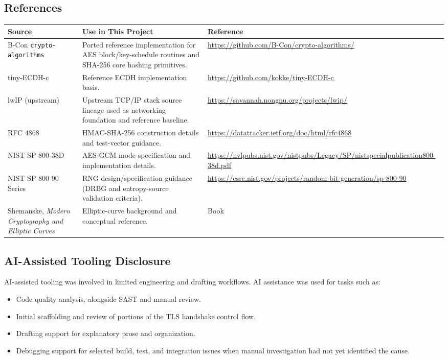 \documentclass[titlepage]{report}
\renewcommand{\arraystretch}{1.5}
\begin{document}
	\subsection{References}
	\begin{table}[htbp]
		\centering
		\renewcommand{\arraystretch}{1.12}
		{\footnotesize
		\begin{tabularx}{\textwidth}{p{} p{} p{}}
			\hline
			\textbf{Source} & \textbf{Use in This Project} & \textbf{Reference} \\
			\hline
			B-Con \texttt{crypto-algorithms} & Ported reference implementation for AES block/key-schedule routines and SHA-256 core hashing primitives. & \url{https://github.com/B-Con/crypto-algorithms/} \\
			tiny-ECDH-c & Reference ECDH implementation basis. & \url{https://github.com/kokke/tiny-ECDH-c} \\
			lwIP (upstream) & Upstream TCP/IP stack source lineage used as networking foundation and reference baseline. & \url{https://savannah.nongnu.org/projects/lwip/} \\
			RFC 4868 & HMAC-SHA-256 construction details and test-vector guidance. & \url{https://datatracker.ietf.org/doc/html/rfc4868} \\
			NIST SP 800-38D & AES-GCM mode specification and implementation details. & \url{https://nvlpubs.nist.gov/nistpubs/Legacy/SP/nistspecialpublication800-38d.pdf} \\
			NIST SP 800-90 Series & RNG design/specification guidance (DRBG and entropy-source validation criteria). & \url{https://csrc.nist.gov/projects/random-bit-generation/sp-800-90} \\
			Shemanske, \textit{Modern Cryptography and Elliptic Curves} & Elliptic-curve background and conceptual reference. & Book \\
			\hline
		\end{tabularx}
		}
	\end{table}

	\subsection{AI-Assisted Tooling Disclosure}
	AI-assisted tooling was involved in limited engineering and drafting workflows. AI assistance was used for tasks such as:
	\begin{itemize}
		\item Code quality analysis, alongside SAST and manual review.
		\item Initial scaffolding and review of portions of the TLS handshake control flow.
		\item Drafting support for explanatory prose and organization.
		\item Debugging support for selected build, test, and integration issues when manual investigation had not yet identified the cause.
	\end{itemize}
\end{document}
